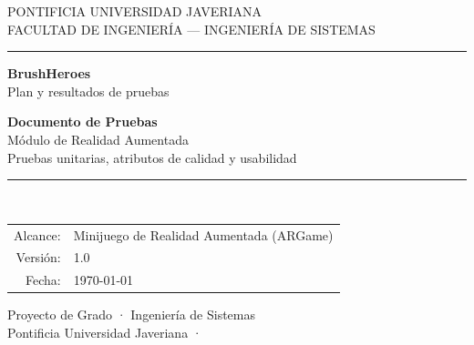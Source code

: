 \documentclass[12pt, a4paper]{article}
\begin{document}
\begin{titlepage}
  \centering
  \vspace*{1.5cm}

  {\small\color{heroGray} PONTIFICIA UNIVERSIDAD JAVERIANA}\\[0.2cm]
  {\small\color{heroGray} FACULTAD DE INGENIERÍA — INGENIERÍA DE SISTEMAS}\\[0.6cm]
  \rule{0.7\textwidth}{0.8pt}

  \vspace{1.8cm}

  \begin{tcolorbox}[
    colback=heroBlue!8, colframe=heroBlue,
    width=0.55\textwidth, halign=center,
    arc=8pt, boxrule=1.2pt,
    top=18pt, bottom=18pt
  ]
    \centering
    {\LARGE\bfseries\color{heroBlue} BrushHeroes}\\[4pt]
    {\small\color{heroGray} Plan y resultados de pruebas}
  \end{tcolorbox}

  \vspace{1.8cm}

  {\huge\bfseries Documento de Pruebas}\\[0.3cm]
  {\Large Módulo de Realidad Aumentada}\\[0.6cm]
  {\large\color{heroGray} Pruebas unitarias, atributos de calidad y usabilidad}

  \vspace{1.5cm}
  \rule{0.5\textwidth}{0.4pt}\\[0.8cm]

  \begin{tabular}{r l}
    \color{heroGray}Alcance:      & Minijuego de Realidad Aumentada (ARGame) \\
    \color{heroGray}Versión:      & 1.0 \\
    \color{heroGray}Fecha:        & \today \\
  \end{tabular}

  \vfill
  {\small\color{heroGray} Proyecto de Grado · Ingeniería de Sistemas\\
  Pontificia Universidad Javeriana · \the\year}
\end{titlepage}

\renewcommand{\contentsname}{Tabla de contenidos}
\tableofcontents
\newpage

\end{document}
